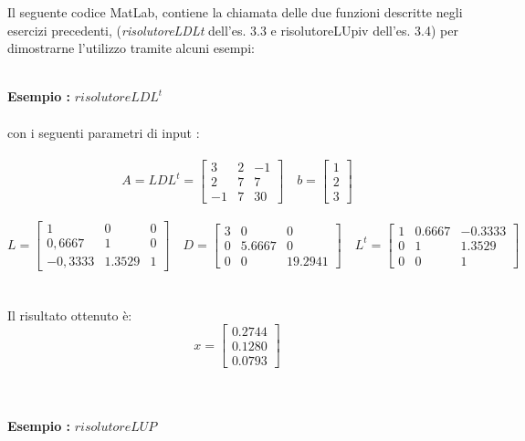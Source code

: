 Il seguente codice MatLab, contiene la chiamata delle due funzioni descritte negli esercizi precedenti, (\textit{risolutoreLDLt}  dell'es. 3.3 e risolutoreLUpiv dell'es. 3.4) per dimostrarne l'utilizzo tramite alcuni esempi:\\\

\begin{description}
\item \textbf{Esempio :} \textit{$risolutoreLDL^t$}\\\\
	con i seguenti parametri di input :\\\	 
	\[
	A = LDL^t =\begin{bmatrix}
		 3 & 2 & -1 \\ 
		 2 & 7 &  7 \\
		-1 & 7 & 30 
	\end{bmatrix} \quad
	b =\begin{bmatrix}
		1 \\
		2 \\
		3                
	\end{bmatrix}
	\]\\
	\[
	L =\begin{bmatrix}
		   1   &   0    & 0 \\ 
		0,6667 &   1    & 0 \\
	   -0,3333 & 1.3529 & 1 
	\end{bmatrix} \quad
	D =\begin{bmatrix}
		3 &   0    &   0    \\ 
		0 & 5.6667 &   0    \\
		0 &   0    & 19.2941 
	\end{bmatrix} \quad
	L^t =\begin{bmatrix}
		1 & 0.6667 & -0.3333 \\ 
		0 &    1   &  1.3529 \\
		0 &    0   &    1 
	\end{bmatrix}
	\]\\\\
	Il risultato ottenuto è:\\
	\[
	x =\begin{bmatrix}
		0.2744 \\
		0.1280 \\
		0.0793                
	\end{bmatrix}
	\]\\\
\item \textbf{Esempio :} \textit{$risolutoreLUP$}\\\\	

\end{description}
